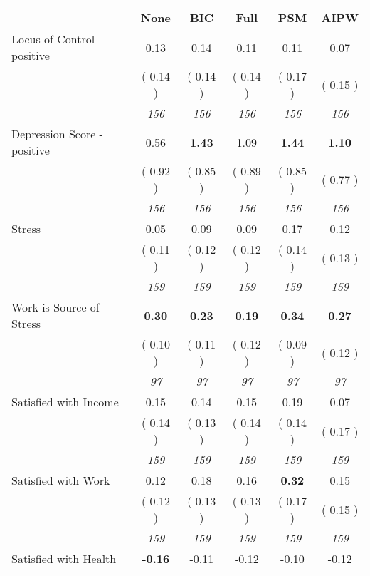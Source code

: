 \begin{tabular}{l c c c c c}
\toprule
 & None & BIC & Full & PSM & AIPW \\
\midrule
Locus of Control - positive &      0.13 &      0.14 &      0.11 &      0.11 &      0.07 \\
& (     0.14 ) & (     0.14 ) & (     0.14 ) & (     0.17 ) & (     0.15 ) \\
& \textit{ 156 } & \textit{ 156 } & \textit{ 156 } & \textit{ 156 } & \textit{ 156 } \\
Depression Score - positive &      0.56 & \textbf{      1.43 } &      1.09 & \textbf{     1.44} & \textbf{     1.10} \\
& (     0.92 ) & (     0.85 ) & (     0.89 ) & (     0.85 ) & (     0.77 ) \\
& \textit{ 156 } & \textit{ 156 } & \textit{ 156 } & \textit{ 156 } & \textit{ 156 } \\
Stress &      0.05 &      0.09 &      0.09 &      0.17 &      0.12 \\
& (     0.11 ) & (     0.12 ) & (     0.12 ) & (     0.14 ) & (     0.13 ) \\
& \textit{ 159 } & \textit{ 159 } & \textit{ 159 } & \textit{ 159 } & \textit{ 159 } \\
Work is Source of Stress & \textbf{      0.30 } & \textbf{      0.23 } & \textbf{      0.19 } & \textbf{     0.34} & \textbf{     0.27} \\
& (     0.10 ) & (     0.11 ) & (     0.12 ) & (     0.09 ) & (     0.12 ) \\
& \textit{ 97 } & \textit{ 97 } & \textit{ 97 } & \textit{ 97 } & \textit{ 97 } \\
Satisfied with Income &      0.15 &      0.14 &      0.15 &      0.19 &      0.07 \\
& (     0.14 ) & (     0.13 ) & (     0.14 ) & (     0.14 ) & (     0.17 ) \\
& \textit{ 159 } & \textit{ 159 } & \textit{ 159 } & \textit{ 159 } & \textit{ 159 } \\
Satisfied with Work &      0.12 &      0.18 &      0.16 & \textbf{     0.32} &      0.15 \\
& (     0.12 ) & (     0.13 ) & (     0.13 ) & (     0.17 ) & (     0.15 ) \\
& \textit{ 159 } & \textit{ 159 } & \textit{ 159 } & \textit{ 159 } & \textit{ 159 } \\
Satisfied with Health & \textbf{     -0.16 } &     -0.11 &     -0.12 &     -0.10 &     -0.12 \\

\end{tabular}
